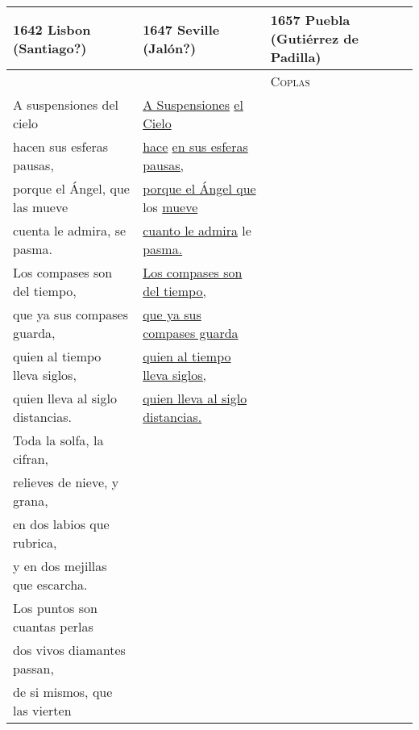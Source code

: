 \documentclass{tex/vcbook-float}
\begin{document}
\begin{tabular}{lll}
    \toprule
    1642 Lisbon (Santiago?) & 
    1647 Seville (Jalón?) & 
    1657 Puebla (Gutiérrez de Padilla) \\
    \midrule 
 
    &
    &
    \textsc{Coplas} \\


    \strophe{} A suspensiones del cielo &
    \strophe{} \uline{A Suspensiones} \uline{el Cielo} & 
    \\

    hacen sus esferas pausas, &
    \uline{hace} \uline{en sus esferas pausas,} &
    \\

    porque el Ángel, que las mueve &
    \uline{porque el Ángel que} los \uline{mueve} &
    \\

    cuenta le admira, se pasma. &
    \uline{cuanto le admira} le \uline{pasma.} &
    \\

    \strophe{} Los compases son del tiempo, &
    \strophe{} \uline{Los compases son del tiempo,} &
    \\

    que ya sus compases guarda, &
    \uline{que ya sus compases guarda} &
    \\

    quien al tiempo lleva siglos, &
    \uline{quien al tiempo lleva siglos,} &
    \\

    quien lleva al siglo distancias. &
    \uline{quien lleva al siglo distancias.} &
    \\

    \strophe{} Toda la solfa, la cifran, &
    & \\

    relieves de nieve, y grana, &
    & \\

    en dos labios que rubrica, &
    & \\

    y en dos mejillas que escarcha. &
    & \\

    \strophe{} Los puntos son cuantas perlas &
    & \\

    dos vivos diamantes passan, &
    & \\

    de si mismos, que las vierten &
    & \\


\end{tabular}
\end{document}
